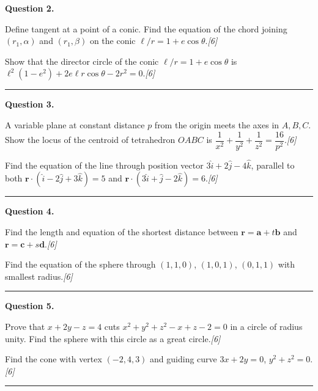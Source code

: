 \documentclass[11pt,a4paper]{article}
\newcommand{\pts}[1]{\hfill   \textit{[#1]}}
\begin{document}
\medskip


\noindent   \textbf{Question 2.}

\begin{parts}
  \item Define tangent at a point of a conic. Find the equation of the chord joining $(r_1,\alpha)$ and $(r_1,\beta)$ on the conic $\ell/r = 1+e\cos \theta$.\pts{6}
  \item Show that the director circle of the conic $\ell/r = 1+e\cos \theta$ is $\ell^2(1-e^2)+2e\ell r\cos \theta - 2r^2=0$.\pts{6}
\end{parts}
\medskip\rule{\linewidth}{0.2pt}

\medskip


\noindent   \textbf{Question 3.}

\begin{parts}
  \item A variable plane at constant distance $p$ from the origin meets the axes in $A,B,C$. Show the locus of the centroid of tetrahedron $OABC$ is $\dfrac{1}{x^2}+\dfrac{1}{y^2}+\dfrac{1}{z^2}=\dfrac{16}{p^2}$.\pts{6}
  \item Find the equation of the line through position vector $3\hat{i}+2\hat{j}-4\hat{k}$, parallel to both $\mathbf{r}\cdot(\hat{i}-2\hat{j}+3\hat{k})=5$ and $\mathbf{r}\cdot(3\hat{i}+\hat{j}-2\hat{k})=6$.\pts{6}
\end{parts}
\medskip\rule{\linewidth}{0.2pt}

\medskip


\noindent   \textbf{Question 4.}

\begin{parts}
  \item Find the length and equation of the shortest distance between $\mathbf{r}=\mathbf{a}+t\mathbf{b}$ and $\mathbf{r}=\mathbf{c}+s\mathbf{d}$.\pts{6}
  \item Find the equation of the sphere through $(1,1,0)$, $(1,0,1)$, $(0,1,1)$ with smallest radius.\pts{6}
\end{parts}
\medskip\rule{\linewidth}{0.2pt}

\medskip


\noindent   \textbf{Question 5.}

\begin{parts}
  \item Prove that $x+2y-z=4$ cuts $x^2+y^2+z^2-x+z-2=0$ in a circle of radius unity. Find the sphere with this circle as a great circle.\pts{6}
  \item Find the cone with vertex $(-2,4,3)$ and guiding curve $3x+2y=0$, $y^2+z^2=0$.\pts{6}
\end{parts}
\medskip\rule{\linewidth}{0.2pt}
\end{document}

